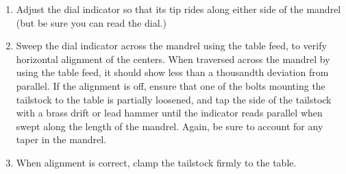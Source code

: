\documentclass[12pt,twoside,letterpaper]{article}
\begin{document}
\begin{enumerate}
	\item Adjust the dial indicator so that its tip rides along either side of the mandrel (but be sure you can read the dial.)
	\item Sweep the dial indicator across the mandrel using the table feed, to verify horizontal alignment of the centers. When traversed across the mandrel by using the table feed, it should show less than a thousandth deviation from parallel. If the alignment is off, ensure that one of the bolts mounting the tailstock to the table is partially loosened, and tap the side of the tailstock with a brass drift or lead hammer until the indicator reads parallel when swept along the length of the mandrel. Again, be sure to account for any taper in the mandrel. 

	\item When alignment is correct, clamp the tailstock firmly to the table.

\end{enumerate}
\end{document}
